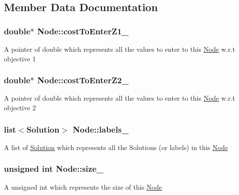 \subsection{\-Member \-Data \-Documentation}
\hypertarget{classNode_a0d70213bcef4604f06d2bb5694ba725d}{
\subsubsection[{cost\-To\-Enter\-Z1\-\_\-}]{\setlength{\rightskip}{0pt plus 5cm}double$\ast$ {\bf \-Node\-::cost\-To\-Enter\-Z1\-\_\-}}}\label{classNode_a0d70213bcef4604f06d2bb5694ba725d}
\-A pointer of double which represents all the values to enter to this {\ttfamily \hyperlink{classNode}{\-Node}} w.\-r.\-t objective 1 \hypertarget{classNode_ae12a8704dddd4e3557927ea8d5c04b8a}{
\subsubsection[{cost\-To\-Enter\-Z2\-\_\-}]{\setlength{\rightskip}{0pt plus 5cm}double$\ast$ {\bf \-Node\-::cost\-To\-Enter\-Z2\-\_\-}}}\label{classNode_ae12a8704dddd4e3557927ea8d5c04b8a}
\-A pointer of double which represents all the values to enter to this {\ttfamily \hyperlink{classNode}{\-Node}} w.\-r.\-t objective 2 \hypertarget{classNode_aaed9b5a5f87464cf60d1026b065cbb60}{
\subsubsection[{labels\-\_\-}]{\setlength{\rightskip}{0pt plus 5cm}list$<${\bf \-Solution}$>$ {\bf \-Node\-::labels\-\_\-}}}\label{classNode_aaed9b5a5f87464cf60d1026b065cbb60}
\-A list of {\ttfamily \hyperlink{classSolution}{\-Solution}} which represents all the {\ttfamily \-Solutions} (or labels) in this {\ttfamily \hyperlink{classNode}{\-Node}} \hypertarget{classNode_a9df2977b4bba73b9bd419f156e1668c8}{
\subsubsection[{size\-\_\-}]{\setlength{\rightskip}{0pt plus 5cm}unsigned int {\bf \-Node\-::size\-\_\-}}}\label{classNode_a9df2977b4bba73b9bd419f156e1668c8}
\-A unsigned int which represents the size of this {\ttfamily \hyperlink{classNode}{\-Node}} 

